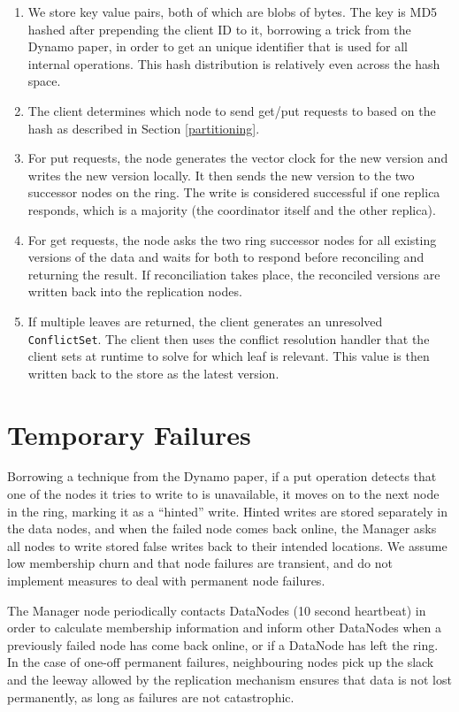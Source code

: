 \documentclass[paper=a4,fontsize=11pt]{report} %
\numberwithin{equation}{section} %
\numberwithin{figure}{section} %
\numberwithin{table}{section} %
\begin{document}
\begin{enumerate}
\item We store key value pairs, both of which are blobs of bytes. The key is MD5 hashed after prepending the client ID to it, borrowing a trick from the Dynamo paper, in order to get an unique identifier that is used for all internal operations. This hash distribution is relatively even across the hash space.
\item The client determines which node to send get/put requests to based on the hash as described in Section \ref{partitioning}.
\item For put requests, the node generates the vector clock for the new version and writes the new version locally. It then sends the new version to the two successor nodes on the ring. The write is considered successful if one replica responds, which is a majority (the coordinator itself and the other replica).
\item For get requests, the node asks the two ring successor nodes for all existing versions of the data and waits for both to respond before reconciling and returning the result. If reconciliation takes place, the reconciled versions are written back into the replication nodes.
\item If multiple leaves are returned, the client generates an unresolved \texttt{ConflictSet}. The client then uses the conflict resolution handler that the client sets at runtime to solve for which leaf is relevant. This value is then written back to the store as the latest version.
\end{enumerate}


\section{Temporary Failures}
Borrowing a technique from the Dynamo paper, if a put operation detects that one of the nodes it tries to write to is unavailable, it moves on to the next node in the ring, marking it as a ``hinted'' write. Hinted writes are stored separately in the data nodes, and when the failed node comes back online, the Manager asks all nodes to write stored false writes back to their intended locations. We assume low membership churn and that node failures are transient, and do not implement measures to deal with permanent node failures.

The Manager node periodically contacts DataNodes (10 second heartbeat) in order to calculate membership information and inform other DataNodes when a previously failed node has come back online, or if a DataNode has left the ring. In the case of one-off permanent failures, neighbouring nodes pick up the slack and the leeway allowed by the replication mechanism ensures that data is not lost permanently, as long as failures are not catastrophic. 
\end{document}
